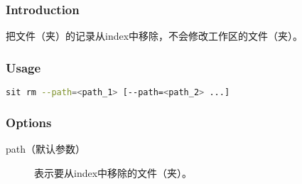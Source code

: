 \subsubsection*{Introduction}
把文件（夹）的记录从index中移除，不会修改工作区的文件（夹）。
\subsubsection*{Usage}
\begin{lstlisting}[language=sh]
sit rm --path=<path_1> [--path=<path_2> ...]
\end{lstlisting}
\subsubsection*{Options}
\begin{description}
	\item[\YaHeiMono path（默认参数）] 表示要从index中移除的文件（夹）。
\end{description}